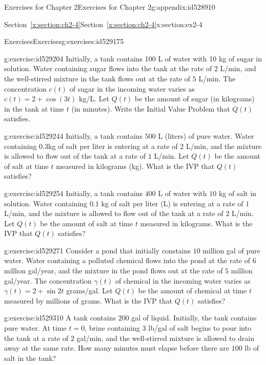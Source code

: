 \documentclass[oneside,10pt,]{book}
\newcommand{\xreffont}{\relax}
\numberwithin{equation}{section}
\numberwithin{equation}{section}
\begin{document}
\begin{appendixptx}{Exercises for Chapter 2}{}{Exercises for Chapter 2}{}{}{g:appendix:id528910}
\begin{sectionptx}{Section~{\xreffont\ref*{x:section:ch2-4}}}{}{Section~{\xreffont\ref*{x:section:ch2-4}}}{}{}{x:section:ex2-4}
\begin{exercises-subsection-numberless}{Exercises}{}{Exercises}{}{}{g:exercises:id529175}
\begin{divisionexercise}{1}{}{}{g:exercise:id529204}
Initially, a tank contains 100 L of water with 10 kg of sugar in solution. Water containing sugar flows into the tank at the rate of \(2\) L\slash{}min, and the well-stirred mixture in the tank flows out at the rate of \(5\) L\slash{}min. The concentration \(c(t)\) of sugar in the incoming water varies as \(c(t)=2+\cos(3t)\) kg\slash{}L. Let \(Q(t)\) be the amount of sugar (in kilograms) in the tank at time \(t\) (in minutes). Write the Initial Value Problem that \(Q(t)\) satisfies.%
\end{divisionexercise}%
\begin{divisionexercise}{2}{}{}{g:exercise:id529244}%
Initially, a tank contains \(500\) L (liters) of pure water. Water containing \(0.3\)kg of salt per liter is entering at a rate of \(2\) L\slash{}min, and the mixture is allowed to flow out of the tank at a rate of \(1\) L\slash{}min. Let \(Q(t)\) be the amount of salt at time \(t\) measured in kilograms (kg). What is the IVP that \(Q(t)\) satisfies?%
\end{divisionexercise}%
\begin{divisionexercise}{3}{}{}{g:exercise:id529254}%
Initially, a tank contains \(400\) L of water with \(10\) kg of salt in solution. Water containing \(0.1\) kg of salt per liter (L) is entering at a rate of \(1\) L\slash{}min, and the mixture is allowed to flow out of the tank at a rate of \(2\) L\slash{}min. Let \(Q(t)\) be the amount of salt at time \(t\) measured in kilograms. What is the IVP that \(Q(t)\) satisfies?%
\end{divisionexercise}%
\begin{divisionexercise}{4}{}{}{g:exercise:id529271}%
Consider a pond that initially constains \(10\) million gal of pure water. Water containing a polluted chemical flows into the pond at the rate of \(6\) million gal\slash{}year, and the mixture in the pond flows out at the rate of \(5\) million gal\slash{}year. The concentration \(\gamma(t)\) of chemical in the incoming water varies as \(\gamma(t)=2+\sin2t\) grams\slash{}gal. Let \(Q(t)\) be the amount of chemical at time \(t\) measured by millions of grams. What is the IVP that \(Q(t)\) satisfies?%
\end{divisionexercise}%
\begin{divisionexercise}{5}{}{}{g:exercise:id529310}%
A tank contains \(200\) gal of liquid. Initially, the tank contains pure water. At time \(t=0\), brine containing \(3\) lb\slash{}gal of salt begins to pour into the tank at a rate of \(2\) gal\slash{}min, and the well-stirred mixture is allowed to drain away at the same rate. How many minutes must elapse before there are \(100\) lb of salt in the tank?%

\end{divisionexercise}
\end{exercises-subsection-numberless}
\end{sectionptx}
\end{appendixptx}
\end{document}
